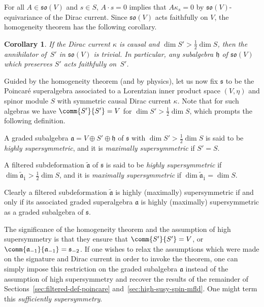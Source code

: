 \documentclass[pdftex]{sigma}
\numberwithin{equation}{section}
\newtheorem{Corollary}[Theorem]{Corollary}
\newcommand{\fa}{\mathfrak{a}}
\newcommand{\fh}{\mathfrak{h}}
\newcommand{\fs}{\mathfrak{s}}
\newcommand{\fso}{\mathfrak{so}}
\newcommand{\fatilde}{\widetilde{\fa}}
\newcommand{\1}{\mathbbm{1}}
\begin{document}
For all $A\in\fso(V)$ and $s\in S$, $A\cdot s=0$ implies that $A \kappa_s=0$ by $\fso(V)$-equivariance of the Dirac current. Since $\fso(V)$ acts faithfully on $V$, the homogeneity theorem has the following corollary.

\begin{Corollary}\label{coro:homog-faithful}
	If the Dirac current $\kappa$ is causal and $\dim S'>\frac{1}{2}\dim S$, then the annihilator of~$S'$ in $\fso(V)$ is trivial. In particular, any subalgebra $\fh$ of $\fso(V)$ which preserves $S'$ acts faithfully on~$S'$.
\end{Corollary}

Guided by the homogeneity theorem (and by physics), let us now fix $\fs$ to be the Poincar\'e superalgebra associated to a Lorentzian inner product space $(V,\eta)$ and spinor module $S$ with symmetric causal Dirac current $\kappa$. Note that for such algebras we have $\comm{S'}{S'}=V$ for $\dim S'>\frac{1}{2}\dim S$, which prompts the following definition.

\begin{Definition}
	A graded subalgebra $\fa=V\oplus S'\oplus\fh$ of $\fs$ with $\dim S'> \frac{1}{2}\dim S$ is said to be \emph{highly supersymmetric}, and it is \emph{maximally supersymmetric} if $S'=S$.
	
	A filtered subdeformation $\fatilde$ of $\fs$ is said to be \emph{highly supersymmetric} if $\dim \fatilde_{\overline 1}> \frac{1}{2}\dim S$, and it is \emph{maximally supersymmetric} if $\dim \fatilde_{\overline 1} = \dim S$.
\end{Definition}

Clearly a filtered subdeformation $\fatilde$ is highly (maximally) supersymmetric if and only if its associated graded superalgebra $\fa$ is highly (maximally) supersymmetric as a graded subalgebra of $\fs$.

\begin{Remark}\label{rem:relaxing-homogeneity-assumption}
	The significance of the homogeneity theorem and the assumption of high supersymmetry is that they ensure that $\comm{S'}{S'}=V$, or $\comm{\fa_{-1}}{\fa_{-1}}=\fs_{-2}$. If one wishes to relax the assumptions which were made on the signature and Dirac current in order to invoke the theorem, one can simply impose this restriction on the graded subalgebra $\fa$ instead of the assumption of high supersymmetry and recover the results of the remainder of Sections~\ref{sec:filtered-def-poincare} and~\ref{sec:high-susy-spin-mfld}. One might term this \emph{sufficiently supersymmetry}.
\end{Remark}
\end{document}
